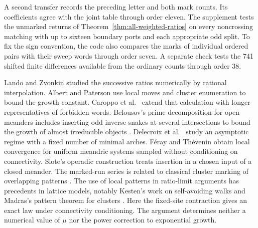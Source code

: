 \documentclass[11pt]{article}
\begin{document}
A second transfer records the preceding letter and both mark counts.
Its coefficients agree with the joint table through order eleven.
The supplement tests the unmarked returns of Theorem~\ref{thm:all-weighted-ratios}
on every noncrossing matching with up to sixteen boundary ports and each
appropriate odd split. To fix the sign convention, the code also compares
the marks of individual ordered pairs with their sweep words through
order seven. A separate check tests the 741 shifted finite differences
available from the ordinary counts through order 38.

Lando and Zvonkin \cite[Sec.~6]{LZ} studied the successive ratios
numerically by rational interpolation. Albert and Paterson \cite{AP}
use local moves and cluster enumeration to bound the growth constant.
Caroppo et al.\ \cite{CDDV} extend that calculation with longer
representatives of forbidden words.
Belousov's prime decomposition for open meanders includes inserting
odd inverse snakes at several intersections to bound the growth of
almost irreducible objects \cite[Thm.~8]{Bel}. Delecroix et al.\
\cite{DGZZ} study an asymptotic regime with a fixed number of minimal
arches. Féray and Thévenin \cite{FT} obtain local convergence for
uniform meandric systems sampled without conditioning on connectivity.
Slote's operadic construction \cite[Definition~2]{Slote} treats
insertion in a chosen input of a closed meander. The marked-run
series is related to classical cluster marking of overlapping
patterns \cite{GJ}. The use of local patterns in ratio-limit arguments has precedents in
lattice models, notably Kesten's work on self-avoiding walks \cite{K}
and Madras's pattern theorem for clusters \cite{Mad}. Here the
fixed-site contraction gives an exact law under connectivity conditioning.
The argument determines neither a numerical value of \(\mu\) nor the
power correction to exponential growth.
\end{document}
